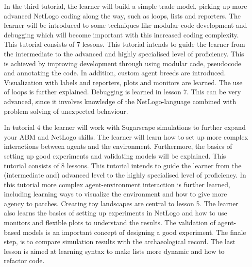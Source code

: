 \documentclass[
]{article}
\begin{document}
In the third tutorial, the learner will build a simple trade model, picking up more advanced NetLogo coding along the way, such as loops, lists and reporters. The learner will be introduced to some techniques like modular code development and debugging which will become important with this increased coding complexity. This tutorial consists of 7 lessons. This tutorial intends to guide the learner from the intermediate to the advanced and highly specialised level of proficiency. This is achieved by improving development through using modular code, pseudocode and annotating the code. In addition, custom agent breeds are introduced. Visualization with labels and reporters, plots and monitors are learned. The use of loops is further explained. Debugging is learned in lesson 7. This can be very advanced, since it involves knowledge of the NetLogo-language combined with problem solving of unexpected behaviour.

In tutorial 4 the learner will work with Sugarscape simulations to further expand your ABM and NetLogo skills. The learner will learn how to set up more complex interactions between agents and the environment. Furthermore, the basics of setting up good experiments and validating models will be explained. This tutorial consists of 8 lessons. This tutorial intends to guide the learner from the (intermediate and) advanced level to the highly specialised level of proficiency. In this tutorial more complex agent-environment interaction is further learned, including learning ways to visualize the environment and how to give more agency to patches. Creating toy landscapes are central to lesson 5. The learner also learns the basics of setting up experiments in NetLogo and how to use monitors and flexible plots to understand the results. The validation of agent-based models is an important concept of designing a good experiment. The finale step, is to compare simulation results with the archaeological record. The last lesson is aimed at learning syntax to make lists more dynamic and how to refactor code.
\end{document}
